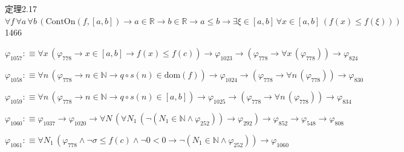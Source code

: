 \begin{fullproof}{定理2.17}{$\forall f\,\forall a\,\forall b\,(\mathrm{ContOn}(f,[a,b]) \to a \in \mathbb{R} \to b \in \mathbb{R} \to a \leq b \to \exists \xi \in [a,b]\,\forall x \in [a,b]\,(f(x) \leq f(\xi)))$}{1466}
\begin{abbrevlist}
\item $\varphi_{1057} :\equiv \forall x\,(\varphi_{778} \to x \in [a,b] \to f(x) \leq f(c)) \to \varphi_{1023} \to (\varphi_{778} \to \forall x\,(\varphi_{778})) \to \varphi_{824}$
\item $\varphi_{1058} :\equiv \forall n\,(\varphi_{778} \to n \in \mathbb{N} \to q \circ s(n) \in \mathrm{dom}(f)) \to \varphi_{1024} \to (\varphi_{778} \to \forall n\,(\varphi_{778})) \to \varphi_{830}$
\item $\varphi_{1059} :\equiv \forall n\,(\varphi_{778} \to n \in \mathbb{N} \to q \circ s(n) \in [a,b]) \to \varphi_{1025} \to (\varphi_{778} \to \forall n\,(\varphi_{778})) \to \varphi_{834}$
\item $\varphi_{1060} :\equiv \varphi_{1037} \to \varphi_{1020} \to \forall N\,(\forall N_{1}\,(\neg (N_{1} \in \mathbb{N} \land \varphi_{252})) \to \varphi_{292}) \to \varphi_{852} \to \varphi_{548} \to \varphi_{808}$
\item $\varphi_{1061} :\equiv \forall N_{1}\,(\varphi_{778} \land \neg \sigma \leq f(c) \land \neg 0 < 0 \to \neg (N_{1} \in \mathbb{N} \land \varphi_{252})) \to \varphi_{1060}$
\end{abbrevlist}
\end{fullproof}

